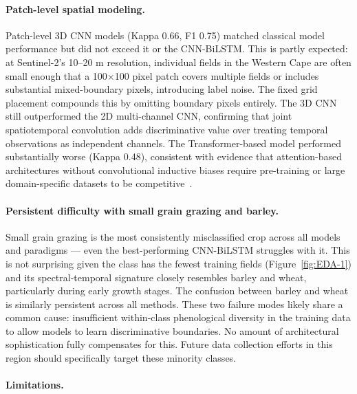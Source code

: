 \documentclass[pdflatex,sn-mathphys]{sn-jnl} %
\begin{document}
\paragraph{Patch-level spatial modeling.}

Patch-level 3D CNN models (Kappa 0.66, F1 0.75) matched classical model
performance but did not exceed it or the CNN-BiLSTM. This is partly expected:
at Sentinel-2's 10–20 m resolution, individual fields in the Western Cape are
often small enough that a 100×100 pixel patch covers multiple fields or
includes substantial mixed-boundary pixels, introducing label noise. The fixed
grid placement compounds this by omitting boundary pixels entirely. The 3D CNN
still outperformed the 2D multi-channel CNN, confirming that joint
spatiotemporal convolution adds discriminative value over treating temporal
observations as independent channels. The Transformer-based model performed
substantially worse (Kappa 0.48), consistent with evidence that attention-based
architectures without convolutional inductive biases require pre-training or
large domain-specific datasets to be competitive~\cite{pankajakshan2026}.

\paragraph{Persistent difficulty with small grain grazing and barley.}

Small grain grazing is the most consistently misclassified crop across all
models and paradigms — even the best-performing CNN-BiLSTM struggles with it.
This is not surprising given the class has the fewest training fields
(Figure~\ref{fig:EDA-1}) and its spectral-temporal signature closely
resembles barley and wheat, particularly during early growth stages. The
confusion between barley and wheat is similarly persistent across all methods.
These two failure modes likely share a common cause: insufficient within-class
phenological diversity in the training data to allow models to learn
discriminative boundaries. No amount of architectural sophistication fully
compensates for this. Future data collection efforts in this region should
specifically target these minority classes.

\paragraph{Limitations.}
\end{document}
